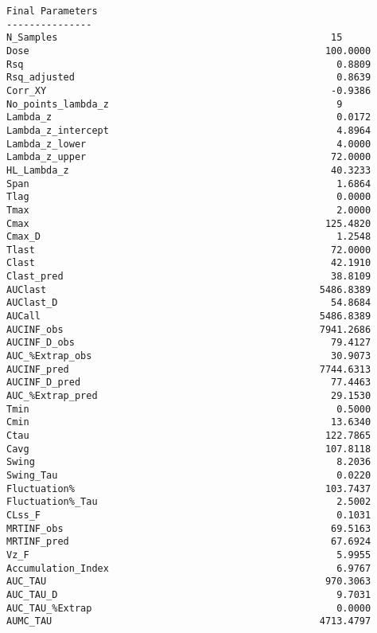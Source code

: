 \documentclass[12pt,a4paper]{article}
\begin{document}
\begin{verbatim}
Final Parameters
---------------
N_Samples                                                15
Dose                                                    100.0000
Rsq                                                       0.8809
Rsq_adjusted                                              0.8639
Corr_XY                                                  -0.9386
No_points_lambda_z                                        9
Lambda_z                                                  0.0172
Lambda_z_intercept                                        4.8964
Lambda_z_lower                                            4.0000
Lambda_z_upper                                           72.0000
HL_Lambda_z                                              40.3233
Span                                                      1.6864
Tlag                                                      0.0000
Tmax                                                      2.0000
Cmax                                                    125.4820
Cmax_D                                                    1.2548
Tlast                                                    72.0000
Clast                                                    42.1910
Clast_pred                                               38.8109
AUClast                                                5486.8389
AUClast_D                                                54.8684
AUCall                                                 5486.8389
AUCINF_obs                                             7941.2686
AUCINF_D_obs                                             79.4127
AUC_%Extrap_obs                                          30.9073
AUCINF_pred                                            7744.6313
AUCINF_D_pred                                            77.4463
AUC_%Extrap_pred                                         29.1530
Tmin                                                      0.5000
Cmin                                                     13.6340
Ctau                                                    122.7865
Cavg                                                    107.8118
Swing                                                     8.2036
Swing_Tau                                                 0.0220
Fluctuation%                                            103.7437
Fluctuation%_Tau                                          2.5002
CLss_F                                                    0.1031
MRTINF_obs                                               69.5163
MRTINF_pred                                              67.6924
Vz_F                                                      5.9955
Accumulation_Index                                        6.9767
AUC_TAU                                                 970.3063
AUC_TAU_D                                                 9.7031
AUC_TAU_%Extrap                                           0.0000
AUMC_TAU                                               4713.4797
\end{verbatim}
\end{document}
